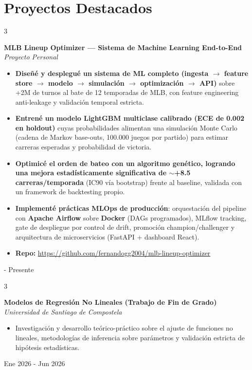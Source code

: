\documentclass[10pt, letterpaper]{article}
\newenvironment{highlights}{
    \begin{itemize}[
        topsep=0.10 cm,
        parsep=0.10 cm,
        partopsep=0pt,
        itemsep=0pt,
        leftmargin=0.4 cm + 10pt
    ]
}{
    \end{itemize}
} %
\newenvironment{threecolentry}[3][]{
    \onecolentry
    \def\thirdColumn{#3}
    \setcolumnwidth{0 cm, \fill, 4.5 cm}
    \begin{paracol}{3}
    \noindent{\raggedright #2}\switchcolumn
}{
    \switchcolumn \raggedleft \thirdColumn
    \end{paracol}
    \endonecolentry
} %
\begin{document}
    \medskip

    \section{Proyectos Destacados}

        \begin{threecolentry}{}{
            2026 - Presente
        }
            \textbf{MLB Lineup Optimizer — Sistema de Machine Learning End-to-End}\\
            \textit{Proyecto Personal}
            \begin{highlights}
                \item \textbf{Diseñé y desplegué un sistema de ML completo (ingesta $\rightarrow$ feature store $\rightarrow$ modelo $\rightarrow$ simulación $\rightarrow$ optimización $\rightarrow$ API)} sobre +2M de turnos al bate de 12 temporadas de MLB, con feature engineering anti-leakage y validación temporal estricta.
                \item \textbf{Entrené un modelo LightGBM multiclase calibrado (ECE de 0.002 en holdout)} cuyas probabilidades alimentan una simulación Monte Carlo (cadena de Markov base-outs, 100.000 juegos por partido) para estimar carreras esperadas y probabilidad de victoria.
                \item \textbf{Optimicé el orden de bateo con un algoritmo genético, logrando una mejora estadísticamente significativa de $\sim$+8.5 carreras/temporada} (IC90 vía bootstrap) frente al baseline, validada con un framework de backtesting propio.
                \item \textbf{Implementé prácticas MLOps de producción}: orquestación del pipeline con \textbf{Apache Airflow} sobre \textbf{Docker} (DAGs programados), MLflow tracking, gate de despliegue por control de drift, promoción champion/challenger y arquitectura de microservicios (FastAPI + dashboard React).
                \item \textbf{Repo: } \url{https://github.com/fernandogg2004/mlb-lineup-optimizer}
            \end{highlights}
        \end{threecolentry}

        \medskip

        \begin{threecolentry}{}{
            Ene 2026 - Jun 2026
        }
            \textbf{Modelos de Regresión No Lineales (Trabajo de Fin de Grado)}\\
            \textit{Universidad de Santiago de Compostela}
            \begin{highlights}
                \item Investigación y desarrollo teórico-práctico sobre el ajuste de funciones no lineales, metodologías de inferencia sobre parámetros y validación estricta de hipótesis estadísticas.
            \end{highlights}
        \end{threecolentry}
\end{document}
